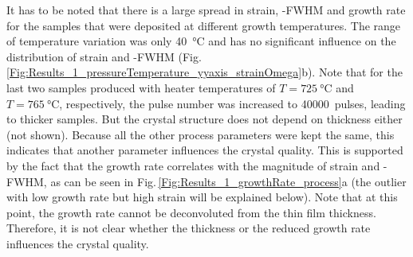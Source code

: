 It has to be noted that there is a large spread in strain, \textomega-FWHM and growth rate for the samples that were deposited at different growth temperatures.
The range of temperature variation was only \qty{40}{\degreeCelsius} and has no significant influence on the distribution of strain and \textomega-FWHM (Fig.\,\ref{Fig:Results_1_pressureTemperature_yyaxis_strainOmega}b).
Note that for the last two samples produced with heater temperatures of $T=\qty{725}{\degreeCelsius}$ and $T=\qty{765}{\degreeCelsius}$, respectively, the pulse number was increased to \qty{40000}{pulses}, leading to thicker samples.
But the crystal structure does not depend on thickness either (not shown).
Because all the other process parameters were kept the same, this indicates that another parameter influences the crystal quality.
This is supported by the fact that the growth rate correlates with the magnitude of strain and \textomega-FWHM, as can be seen in Fig.\,\ref{Fig:Results_1_growthRate_process}a (the outlier with low growth rate but high strain will be explained below).
Note that at this point, the growth rate cannot be deconvoluted from the thin film thickness.
Therefore, it is not clear whether the thickness or the reduced growth rate influences the crystal quality.


